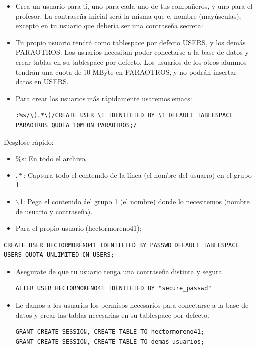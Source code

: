 \documentclass[11pt]{article}
\begin{document}
\begin{itemize}
\item Crea un usuario para tí, uno para cada uno de tus compañeros, y uno para el profesor. La contraseña inicial será la misma que el nombre (mayúsculas), excepto en tu usuario que debería ser una contraseña secreta:

\item Tu propio usuario tendrá como tablespace por defecto USERS, y los demás PARAOTROS.
Los usuarios necesitan poder conectarse a la base de datos y crear tablas en su tablespace por defecto.
Los usuarios de los otros alumnos tendrán una cuota de 10 MByte en PARAOTROS, y no podrán insertar datos en USERS.

\item Para crear los usuarios más rápidamente usaremos emacs:

\begin{verbatim}
:%s/\(.*\)/CREATE USER \1 IDENTIFIED BY \1 DEFAULT TABLESPACE PARAOTROS QUOTA 10M ON PARAOTROS;/
\end{verbatim}
\end{itemize}
Desglose rápido:

\begin{itemize}
\item \%s: En todo el archivo.

\item \(.*\): Captura todo el contenido de la línea (el nombre del usuario) en el grupo 1.

\item $\backslash$1: Pega el contenido del grupo 1 (el nombre) donde lo necesitemos (nombre de usuario y contraseña).
\end{itemize}

\begin{itemize}
\item Para el propio usuario (hectormoreno41):
\end{itemize}

\begin{verbatim}
CREATE USER HECTORMORENO41 IDENTIFIED BY PASSWD DEFAULT TABLESPACE USERS QUOTA UNLIMITED ON USERS;
\end{verbatim}

\begin{itemize}
\item Asegurate de que tu usuario tenga una contraseña distinta y segura.

\begin{verbatim}
ALTER USER HECTORMORENO41 IDENTIFIED BY "secure_passwd"
\end{verbatim}

\item Le damos a los usuarios los permisos necesarios para conectarse a la base de datos y crear las tablas necesarias en su tablespace por defecto.

\begin{verbatim}
GRANT CREATE SESSION, CREATE TABLE TO hectormoreno41;
GRANT CREATE SESSION, CREATE TABLE TO demas_usuarios;
\end{verbatim}
\end{itemize}
\end{document}
